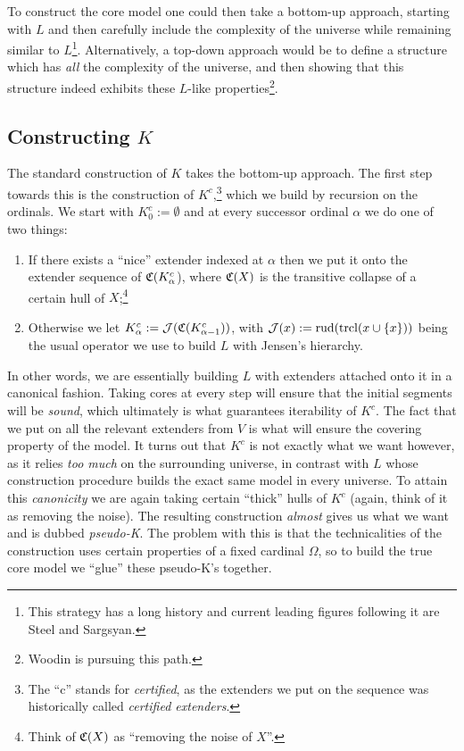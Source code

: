 \documentclass[../../main]{subfiles}
\begin{document}
\qquad To construct the core model one could then take a bottom-up approach, starting with $L$ and then carefully include the complexity of the universe while remaining similar to $L$\footnote{This strategy has a long history and current leading figures following it are Steel and Sargsyan.}. Alternatively, a top-down approach would be to define a structure which has \textit{all} the complexity of the universe, and then showing that this structure indeed exhibits these $L$-like properties\footnote{Woodin is pursuing this path.}.

\subsection{Constructing $K$}

The standard construction of $K$ takes the bottom-up approach. The first step towards this is the construction of $K^c$,\footnote{The ``c'' stands for \textit{certified}, as the extenders we put on the sequence was historically called \textit{certified extenders}.} which we build by recursion on the ordinals. We start with $K^c_0 := \emptyset$ and at every successor ordinal $\alpha$ we do one of two things:

\begin{enumerate}
  \item If there exists a ``nice'' extender indexed at $\alpha$ then we put it onto the extender sequence of $\mathfrak C(K^c_\alpha$), where $\mathfrak C(X)$ is the transitive collapse of a certain hull of $X$;\footnote{Think of $\mathfrak C(X)$ as ``removing the noise of $X$''.}
  \item Otherwise we let $K^c_\alpha := \operatorname{\mathcal J}(\mathfrak C(K^c_{\alpha-1}))$, with $\operatorname{\mathcal J}(x):=\text{rud}(\operatorname{trcl}(x\cup\{x\}))$ being the usual operator we use to build $L$ with Jensen's hierarchy.\\
\end{enumerate}

In other words, we are essentially building $L$ with extenders attached onto it in a canonical fashion. Taking cores at every step will ensure that the initial segments will be \textit{sound}, which ultimately is what guarantees iterability of $K^c$. The fact that we put on all the relevant extenders from $V$ is what will ensure the covering property of the model. It turns out that $K^c$ is not exactly what we want however, as it relies \textit{too much} on the surrounding universe, in contrast with $L$ whose construction procedure builds the exact same model in every universe. To attain this \textit{canonicity} we are again taking certain ``thick'' hulls of $K^c$ (again, think of it as removing the noise). The resulting construction \textit{almost} gives us what we want and is dubbed \textit{pseudo-K}. The problem with this is that the technicalities of the construction uses certain properties of a fixed cardinal $\Omega$, so to build the true core model we ``glue'' these pseudo-K's together.
\end{document}
